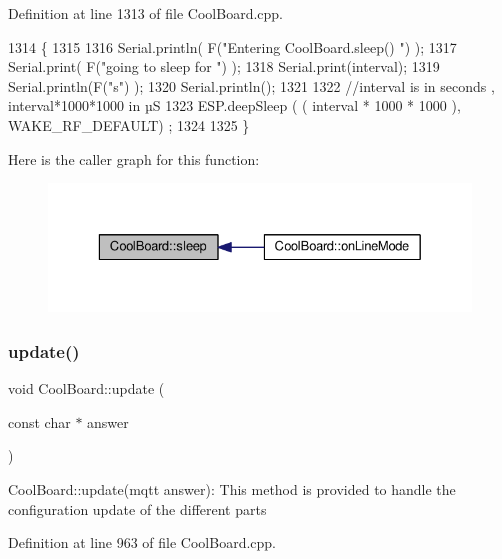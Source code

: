 Definition at line 1313 of file Cool\+Board.\+cpp.


\begin{DoxyCode}
1314 \{
1315 
1316     Serial.println( F(\textcolor{stringliteral}{"Entering CoolBoard.sleep() "}) );
1317     Serial.print( F(\textcolor{stringliteral}{"going to sleep for "}) );
1318     Serial.print(interval);
1319     Serial.println(F(\textcolor{stringliteral}{"s"}) );
1320     Serial.println();
1321     
1322     \textcolor{comment}{//interval is in seconds , interval*1000*1000 in µS}
1323     ESP.deepSleep ( ( interval * 1000 * 1000 ), WAKE\_RF\_DEFAULT) ;
1324 
1325 \}
\end{DoxyCode}
Here is the caller graph for this function\+:
\nopagebreak
\begin{figure}[H]
\begin{center}
\leavevmode
\includegraphics[width=329pt]{d7/df9/class_cool_board_a069952cdcb2e7f68518aa429eceadb6e_icgraph}
\end{center}
\end{figure}
\mbox{\label{class_cool_board_a8612756d3f73198cdde857a66f0fe690}} 
\subsubsection{\texorpdfstring{update()}{update()}}
{\footnotesize\ttfamily void Cool\+Board\+::update (\begin{DoxyParamCaption}\item[{const char $\ast$}]{answer }\end{DoxyParamCaption})}

Cool\+Board\+::update(mqtt answer)\+: This method is provided to handle the configuration update of the different parts 

Definition at line 963 of file Cool\+Board.\+cpp.


